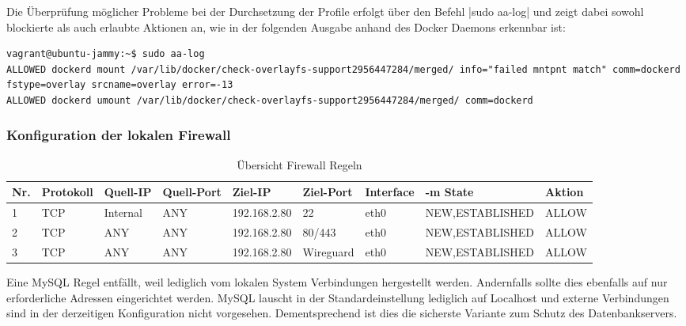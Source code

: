 Die Überprüfung möglicher Probleme bei der Durchsetzung der Profile erfolgt über den Befehl |sudo aa-log|
und zeigt dabei sowohl blockierte als auch erlaubte Aktionen an, wie in der folgenden Ausgabe anhand des Docker Daemons erkennbar ist:

\begin{verbatim}
vagrant@ubuntu-jammy:~$ sudo aa-log 
ALLOWED dockerd mount /var/lib/docker/check-overlayfs-support2956447284/merged/ info="failed mntpnt match" comm=dockerd fstype=overlay srcname=overlay error=-13
ALLOWED dockerd umount /var/lib/docker/check-overlayfs-support2956447284/merged/ comm=dockerd
\end{verbatim}

\subsubsection{Konfiguration der lokalen Firewall}


\begin{table}[!ht]
    \centering
    \begin{adjustbox}{width=\textwidth}

    \begin{tabular}{|l|l|l|l|l|l|l|l|l|}
        \hline
            Nr. & Protokoll & Quell-IP & Quell-Port & Ziel-IP & Ziel-Port & Interface & -m State & Aktion \\ \hline
            1 & TCP & Internal & ANY & 192.168.2.80 & 22 & eth0 & NEW,ESTABLISHED & ALLOW \\ \hline
            2 & TCP & ANY & ANY & 192.168.2.80 & 80/443 & eth0 & NEW,ESTABLISHED & ALLOW \\ \hline
            3 & TCP & ANY & ANY & 192.168.2.80 & Wireguard & eth0 & NEW,ESTABLISHED & ALLOW \\ \hline
        \end{tabular}
    \end{adjustbox}
    \caption{Übersicht Firewall Regeln}
    \label{regeln_fw_incoming}
\end{table}

Eine MySQL Regel entfällt, weil lediglich vom lokalen System Verbindungen hergestellt werden. Andernfalls sollte dies ebenfalls auf nur erforderliche Adressen eingerichtet werden. MySQL lauscht in der Standardeinstellung lediglich auf Localhost und externe Verbindungen sind in der derzeitigen Konfiguration nicht vorgesehen. Dementsprechend ist dies die sicherste Variante zum Schutz des Datenbankservers.

